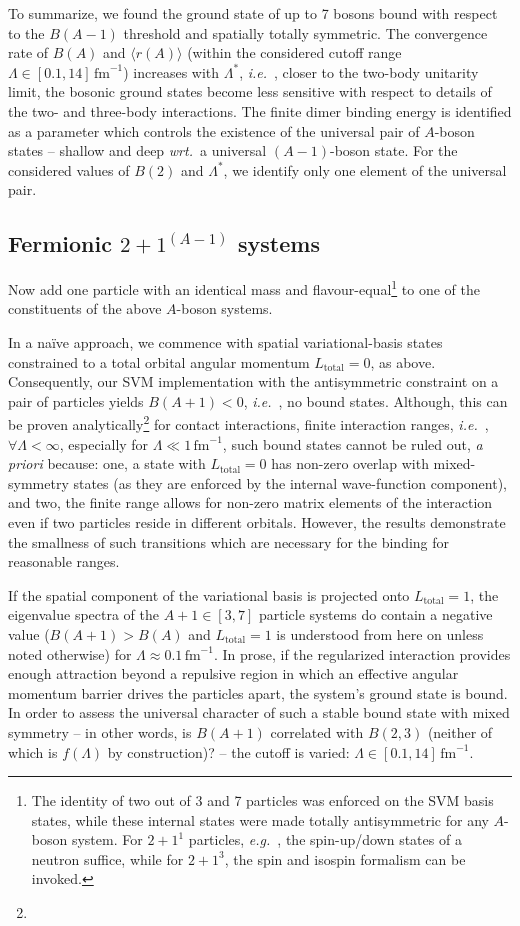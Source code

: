 \documentclass[preprint,12pt]{elsarticle}
\newcommand{\fm}{\ensuremath{\,\text{fm}^{-1}}}
\newcommand{\abb}{\ensuremath{2\!+\!1^{(A-1)}}}
\newcommand{\wrt}{\textit{wrt.}~}
\newcommand{\eg}{\textit{e.g.}~}
\newcommand{\ie}{\textit{i.e.}~}
\newcommand{\rms}[1]{\ensuremath{\langle r(#1)\rangle}}
\begin{document}
To summarize, we found the ground state of up to 7 bosons bound with respect to the
$B(A-1)$ threshold and spatially totally symmetric.
The convergence rate of $B(A)$ and $\rms{A}$ (within the considered cutoff range
$\Lambda\in[0.1,14]\fm$) increases with $\Lambda^*$, \ie, closer to the 
two-body unitarity limit, the bosonic
ground states become less sensitive with respect to details of the two- and three-body 
interactions. The finite dimer binding energy is identified as a parameter which
controls the existence of the universal pair of $A$-boson states -- shallow and deep
\wrt a universal $(A-1)$-boson state. For the considered values of $B(2)$ and
$\Lambda^*$, we identify only one element of the universal pair.

\subsection{Fermionic $\abb$ systems}
Now add one particle with an identical mass and
flavour-equal\footnote{
The identity of two out of 3 and 7 particles was enforced on the SVM basis
states, while these internal states were made totally
antisymmetric for any $A$-boson system. For $2+1^1$ particles, \eg, the 
spin-up/down states of a neutron suffice,
while for $2+1^3$, the spin and isospin formalism can be invoked.}
to one of the constituents of the above $A$-boson systems.

In a na\"ive approach, we
commence with spatial variational-basis states constrained to
a total orbital angular momentum $L_\text{total}=0$, as above.
Consequently, our SVM implementation with the antisymmetric constraint
on a pair of particles yields $B(A+1)<0$, \ie, no bound states.
Although, this can be proven analytically\footnote{} for contact interactions,
finite interaction ranges, \ie, $\forall\Lambda<\infty$, especially for
$\Lambda\ll 1\fm$, such bound states cannot be ruled out, {\it a priori}
because: one, a state with $L_\text{total}=0$ has non-zero overlap with 
mixed-symmetry states (as they are enforced by the internal wave-function component), 
and two, the finite range allows for 
non-zero matrix elements of the interaction even if two particles reside 
in different orbitals.
However, the results demonstrate the smallness of such transitions
which are necessary for the binding for reasonable ranges.

If the spatial component of the variational basis is projected
onto $L_\text{total}=1$, the eigenvalue spectra of
the $A+1\in[3,7]$ particle systems do contain a negative value ($B(A+1)>B(A)$ and
$L_\text{total}=1$ is understood from here on unless noted otherwise)
for $\Lambda\approx0.1\fm$.
In prose, if the regularized interaction provides enough attraction beyond
a repulsive region in which an effective
angular momentum barrier drives the particles apart,
the system's ground state is bound.
In order to assess the universal character of such a stable bound state
with mixed symmetry -- in other words, is $B(A+1)$ correlated
with $B(2,3)$ (neither of which is $f(\Lambda)$ by construction)? --
the cutoff is varied: $\Lambda\in[0.1,14]\fm$.
\end{document}
